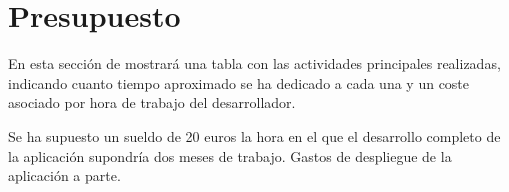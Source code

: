 %
%
%
%
\chapter{Presupuesto}

En esta sección de mostrará una tabla con las actividades principales realizadas, indicando cuanto tiempo aproximado se ha dedicado a cada una y un coste asociado por hora de trabajo del desarrollador. 

Se ha supuesto un sueldo de 20 euros la hora en el que el desarrollo completo de la aplicación supondría dos meses de trabajo. Gastos de despliegue de la aplicación a parte.

\bigskip
\begin{table}[H]
\centering
{}
\caption{Tiempo dedicado y coste}
\label{my-label}
\end{table}